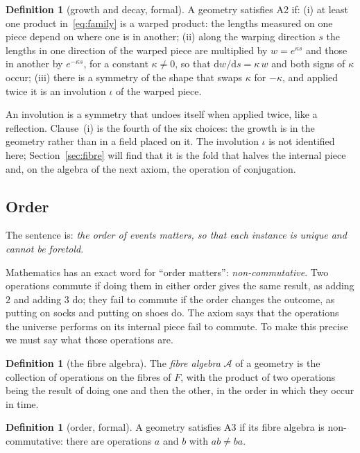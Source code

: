 \documentclass[11pt,a4paper]{article}
\theoremstyle{plain}
\theoremstyle{definition}
\newtheorem{definition}[theorem]{Definition}
\theoremstyle{remark}
\begin{document}
\begin{definition}[growth and decay, formal]\label{def:A2}
A geometry satisfies A2 if: (i) at least one product in~\eqref{eq:family} is a warped product: the lengths measured on one piece depend on where one is in another; (ii) along the warping direction $s$ the lengths in one direction of the warped piece are multiplied by $w=e^{\kappa s}$ and those in another by $e^{-\kappa s}$, for a constant $\kappa\neq0$, so that $\mathrm{d}w/\mathrm{d}s=\kappa\,w$ and both signs of $\kappa$ occur; (iii) there is a symmetry of the shape that swaps $\kappa$ for $-\kappa$, and applied twice it is an involution $\iota$ of the warped piece.
\end{definition}

An involution is a symmetry that undoes itself when applied twice, like a reflection. Clause~(i) is the fourth of the six choices: the growth is in the geometry rather than in a field placed on it. The involution $\iota$ is not identified here; Section~\ref{sec:fibre} will find that it is the fold that halves the internal piece and, on the algebra of the next axiom, the operation of conjugation.

\subsection{Order}\label{sec:A3}

The sentence is: \emph{the order of events matters, so that each instance is unique and cannot be foretold}.

Mathematics has an exact word for ``order matters'': \emph{non-commutative}. Two operations commute if doing them in either order gives the same result, as adding $2$ and adding $3$ do; they fail to commute if the order changes the outcome, as putting on socks and putting on shoes do. The axiom says that the operations the universe performs on its internal piece fail to commute. To make this precise we must say what those operations are.

\begin{definition}[the fibre algebra]\label{def:fibrealg}
The \emph{fibre algebra} $\mathcal{A}$ of a geometry is the collection of operations on the fibres of $F$, with the product of two operations being the result of doing one and then the other, in the order in which they occur in time.
\end{definition}

\begin{definition}[order, formal]\label{def:A3}
A geometry satisfies A3 if its fibre algebra is non-commutative: there are operations $a$ and $b$ with $ab\neq ba$.
\end{definition}
\end{document}

